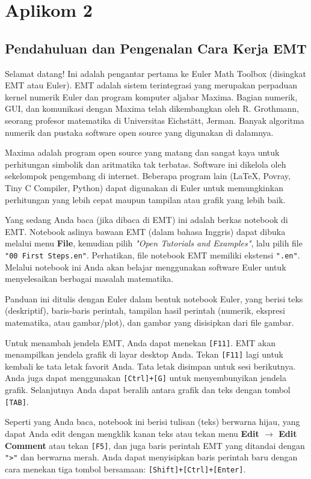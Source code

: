 \documentclass[11pt, a4paper]{article}
\begin{document}
\section*{Aplikom 2}

\subsection*{Pendahuluan dan Pengenalan Cara Kerja EMT}

Selamat datang! Ini adalah pengantar pertama ke Euler Math Toolbox (disingkat EMT atau Euler). EMT adalah sistem terintegrasi yang merupakan perpaduan kernel numerik Euler dan program komputer aljabar Maxima. Bagian numerik, GUI, dan komunikasi dengan Maxima telah dikembangkan oleh R. Grothmann, seorang profesor matematika di Universitas Eichst\"att, Jerman. Banyak algoritma numerik dan pustaka software open source yang digunakan di dalamnya.

Maxima adalah program open source yang matang dan sangat kaya untuk perhitungan simbolik dan aritmatika tak terbatas. Software ini dikelola oleh sekelompok pengembang di internet. Beberapa program lain (LaTeX, Povray, Tiny C Compiler, Python) dapat digunakan di Euler untuk memungkinkan perhitungan yang lebih cepat maupun tampilan atau grafik yang lebih baik.

Yang sedang Anda baca (jika dibaca di EMT) ini adalah berkas notebook di EMT. Notebook aslinya bawaan EMT (dalam bahasa Inggris) dapat dibuka melalui menu \textbf{File}, kemudian pilih \textit{"Open Tutorials and Examples"}, lalu pilih file \texttt{"00 First Steps.en"}. Perhatikan, file notebook EMT memiliki ekstensi \texttt{".en"}. Melalui notebook ini Anda akan belajar menggunakan software Euler untuk menyelesaikan berbagai masalah matematika.

Panduan ini ditulis dengan Euler dalam bentuk notebook Euler, yang berisi teks (deskriptif), baris-baris perintah, tampilan hasil perintah (numerik, ekspresi matematika, atau gambar/plot), dan gambar yang disisipkan dari file gambar.

Untuk menambah jendela EMT, Anda dapat menekan \texttt{[F11]}. EMT akan menampilkan jendela grafik di layar desktop Anda. Tekan \texttt{[F11]} lagi untuk kembali ke tata letak favorit Anda. Tata letak disimpan untuk sesi berikutnya. Anda juga dapat menggunakan \texttt{[Ctrl]+[G]} untuk menyembunyikan jendela grafik. Selanjutnya Anda dapat beralih antara grafik dan teks dengan tombol \texttt{[TAB]}.

Seperti yang Anda baca, notebook ini berisi tulisan (teks) berwarna \textcolor{emtcomment}{hijau}, yang dapat Anda edit dengan mengklik kanan teks atau tekan menu \textbf{Edit $\rightarrow$ Edit Comment} atau tekan \texttt{[F5]}, dan juga baris perintah EMT yang ditandai dengan \texttt{">"} dan berwarna \textcolor{emtcommand}{merah}. Anda dapat menyisipkan baris perintah baru dengan cara menekan tiga tombol bersamaan: \texttt{[Shift]+[Ctrl]+[Enter]}.
\end{document}
